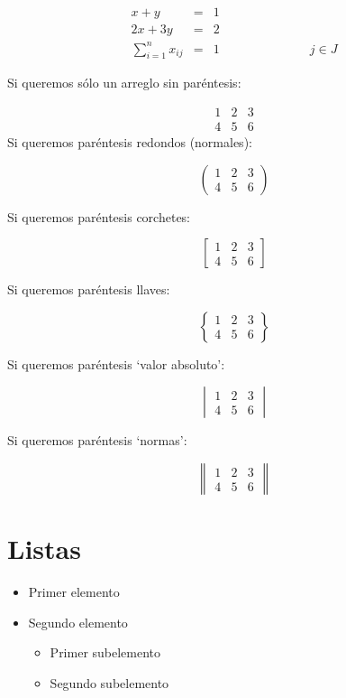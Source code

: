 \documentclass[]{article}
\begin{document}
\[
	\begin{array}{rcl}
		x+y & = & 1\\
		2x +3y &=& 2\\
		\displaystyle{\sum_{i=1}^{n} x_{ij}} &=& 1 \hspace{3cm}   j\in J
	\end{array}
\]

Si queremos sólo un arreglo sin paréntesis:

\[
\begin{matrix}
	1 & 2 &3 \\
	4 & 5 & 6
\end{matrix}
\]
Si queremos paréntesis redondos (normales):

\[
\begin{pmatrix}
	1 & 2 &3 \\
	4 & 5 & 6
\end{pmatrix}
\]

Si queremos paréntesis corchetes:

\[
\begin{bmatrix}
	1 & 2 &3 \\
	4 & 5 & 6
\end{bmatrix}
\]

Si queremos paréntesis llaves:

\[
\begin{Bmatrix}
	1 & 2 &3 \\
	4 & 5 & 6
\end{Bmatrix}
\]

Si queremos paréntesis `valor absoluto':

\[
\begin{vmatrix}
	1 & 2 &3 \\
	4 & 5 & 6
\end{vmatrix}
\]

Si queremos paréntesis `normas':

\[
\begin{Vmatrix}
	1 & 2 &3 \\
	4 & 5 & 6
\end{Vmatrix}
\]

\section{Listas}

\begin{itemize}
	\item Primer elemento
	\item Segundo elemento
	\begin{itemize}
		\item Primer subelemento
		\item Segundo subelemento
	\end{itemize}
\end{itemize}
\end{document}
